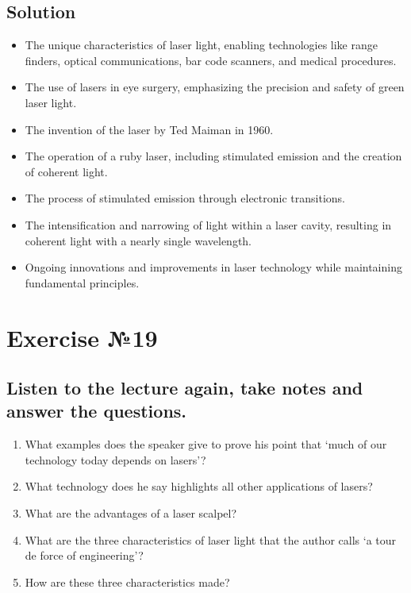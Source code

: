 \subsection*{Solution}
\begin{itemize}
      \item The unique characteristics of laser light, enabling technologies like range finders, optical communications, bar code scanners, and medical procedures.
      \item The use of lasers in eye surgery, emphasizing the precision and safety of green laser light.
      \item The invention of the laser by Ted Maiman in 1960.
      \item The operation of a ruby laser, including stimulated emission and the creation of coherent light.
      \item The process of stimulated emission through electronic transitions.
      \item The intensification and narrowing of light within a laser cavity, resulting in coherent light with a nearly single wavelength.
      \item Ongoing innovations and improvements in laser technology while maintaining fundamental principles.
\end{itemize}

\section*{Exercise №19}
\subsection*{Listen to the lecture again, take notes and answer the questions.}

\begin{enumerate}
      \item What examples does the speaker give to prove his point that ‘much of our technology
            today depends on lasers’?
      \item What technology does he say highlights all other applications of lasers?
      \item What are the advantages of a laser scalpel?
      \item What are the three characteristics of laser light that the author calls ‘a tour de force of
            engineering’?
      \item How are these three characteristics made?
\end{enumerate}

